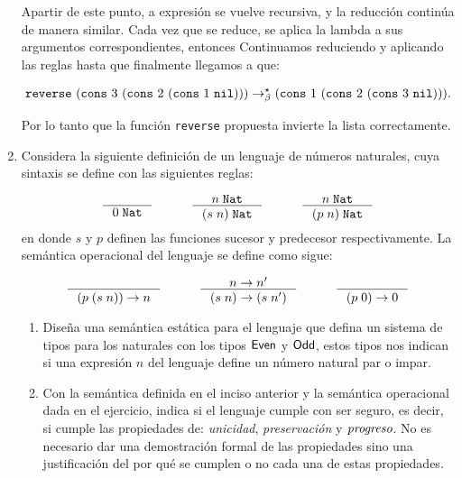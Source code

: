 \documentclass{article}
\begin{document}
\begin{enumerate}
        Apartir de este punto, a expresión se vuelve recursiva, y la reducción continúa de manera similar. Cada vez que se reduce, se aplica la lambda a sus argumentos correspondientes, entonces Continuamos reduciendo y aplicando las reglas hasta que finalmente llegamos a que:
 
        \[{\tt reverse}\,\, ({\tt cons}\,\, 3\,\, ({\tt cons}\,\, 2\,\, ({\tt cons}\,\, 1\,\, {\tt nil}))) \to^\star_\beta ({\tt cons}\,\, 1\,\, ({\tt cons}\,\, 2\,\, ({\tt cons}\,\, 3\,\, {\tt nil}))).\]

        Por lo tanto que la función {\tt reverse} propuesta invierte la lista correctamente.\\

        \item Considera la siguiente definición de un lenguaje de números naturales, cuya sintaxis se define con las siguientes reglas:

         \[
        \begin{array}{ccccc}
            \inference{}{0\;\tt{Nat}}&
            \quad&
            \inference{n\;\tt{Nat}}{(s\;n)\;\tt{Nat}}&
            \quad&
            \inference{n\;\tt{Nat}}{(p\;n)\;\tt{Nat}}
        \end{array}
        \]
        \noindent
        en donde $s$ y $p$ definen las funciones sucesor y predecesor respectivamente. La semántica operacional del lenguaje se define como sigue:

        \[
        \begin{array}{ccccc}
            \inference{}{(p\;(s\;n))\to n}&
            \quad&
            \inference{n\to n'}{(s\;n)\to(s\;n')}&
            \quad&
            \inference{}{(p\;0)\to 0}
        \end{array}
        \]

        \begin{enumerate}
            \item Diseña una semántica estática para el lenguaje que defina un sistema de tipos para los naturales con los tipos ${\sf Even}$ y ${\sf Odd}$, estos tipos nos indican si una expresión $n$ del lenguaje define un número natural par o impar.
            \item Con la semántica definida en el inciso anterior y la semántica operacional dada en el ejercicio, indica si el lenguaje cumple con ser seguro, es decir, si cumple las propiedades de: {\it unicidad}, {\it preservación} y ${\it progreso}$. No es necesario dar una demostración formal de las propiedades sino una justificación del por qué se cumplen o no cada una de estas propiedades.
        \end{enumerate}
    \end{enumerate}
\end{document}
